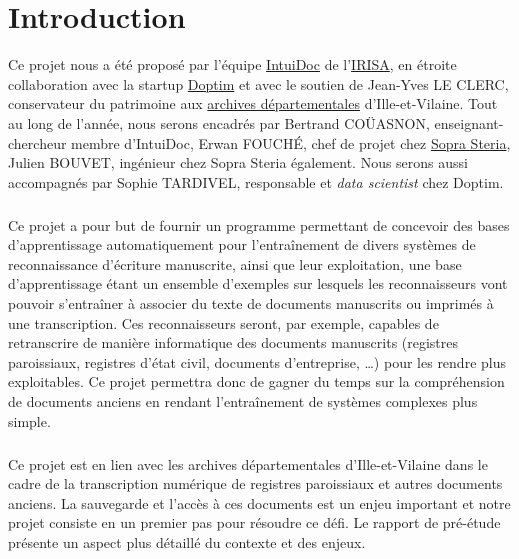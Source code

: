 \chapter{Introduction}
\setcounter{page}{1}
\pagestyle{fancy}
\fancyhf{}
\cfoot[\thepage]{\thepage}

Ce projet nous a été proposé par l’équipe \href{https://www-intuidoc.irisa.fr/}{IntuiDoc}
de l’\href{https://www.irisa.fr/}{IRISA}, en étroite collaboration avec la startup
\href{http://www.doptim.eu}{Doptim} et avec le soutien de Jean-Yves LE CLERC, conservateur du
patrimoine aux \href{http://archives.ille-et-vilaine.fr/fr}{archives départementales} d'Ille-et-Vilaine.
Tout au long de l’année, nous serons encadrés par Bertrand COÜASNON, enseignant-chercheur membre d'IntuiDoc,
Erwan FOUCHÉ, chef de projet chez \href{https://www.soprasteria.com/fr}{Sopra Steria}, Julien BOUVET,
ingénieur chez Sopra Steria également. Nous serons aussi accompagnés par Sophie TARDIVEL, responsable
et \textit{data scientist} chez Doptim.

\paragraph{}
Ce projet a pour but de fournir un programme permettant de concevoir des bases d’apprentissage
automatiquement pour l’entraînement de divers systèmes de reconnaissance d’écriture manuscrite,
ainsi que leur exploitation, une base d'apprentissage étant un ensemble
d'exemples sur lesquels les reconnaisseurs vont pouvoir s'entraîner à associer
du texte de documents manuscrits ou imprimés à une transcription. Ces reconnaisseurs seront, par exemple,
capables de retranscrire de manière informatique des documents manuscrits
(registres paroissiaux, registres d’état civil, documents d’entreprise,
\ldots) pour les rendre plus exploitables. Ce projet permettra donc de gagner
du temps sur la compréhension de documents anciens en rendant l’entraînement
de systèmes complexes plus simple.

\paragraph{}
Ce projet est en lien avec les archives départementales d’Ille-et-Vilaine dans le cadre de la transcription numérique de registres paroissiaux et autres documents anciens. La sauvegarde et 
l’accès à ces documents est un enjeu important et notre projet consiste en un premier pas pour 
résoudre ce défi. Le rapport de pré-étude présente un aspect plus détaillé du contexte et des enjeux.

